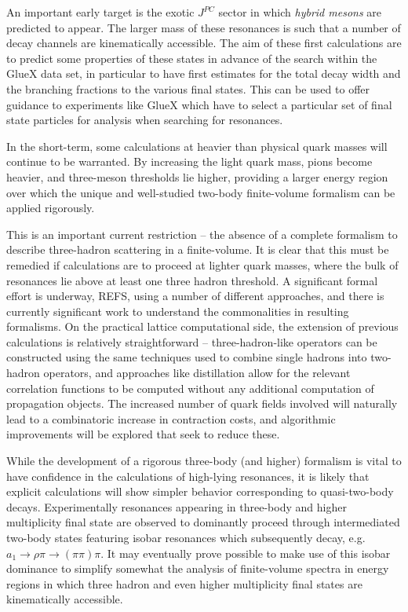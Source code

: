 {An important early target is the exotic $J^{PC}$ sector in which \emph{hybrid mesons} are predicted to appear. The larger mass of these resonances is such that a number of decay channels are kinematically accessible. The aim of these first calculations are to predict some properties of these states in advance of the search within the GlueX data set, in particular to have first estimates for the total decay width and the branching fractions to the various final states. This can be used to offer guidance to experiments like GlueX which have to select a particular set of final state particles for analysis when searching for resonances.

In the short-term, some calculations at heavier than physical quark masses will continue to be warranted. By increasing the light quark mass, pions become heavier, and three-meson thresholds lie higher, providing a larger energy region over which the unique and well-studied two-body finite-volume formalism can be applied rigorously. 

This is an important current restriction -- the absence of a complete formalism to describe three-hadron scattering in a finite-volume. It is clear that this must be remedied if calculations are to proceed at lighter quark masses, where the bulk of resonances lie above at least one three hadron threshold. A significant formal effort is underway, {\color{red}REFS}, using a number of different approaches, and there is currently significant work to understand the commonalities in resulting formalisms. On the practical lattice computational side, the extension of previous calculations is relatively straightforward -- three-hadron-like operators can be constructed using the same techniques used to combine single hadrons into two-hadron operators, and approaches like distillation allow for the relevant correlation functions to be computed without any additional computation of propagation objects. The increased number of quark fields involved will naturally lead to a combinatoric increase in contraction costs, and algorithmic improvements will be explored that seek to reduce these.

While the development of a rigorous three-body (and higher) formalism is vital to have confidence in the calculations of high-lying resonances, it is likely that explicit calculations will show simpler behavior corresponding to quasi-two-body decays. Experimentally resonances appearing in three-body and higher multiplicity final state are observed to dominantly proceed through intermediated two-body states featuring isobar resonances which subsequently decay, e.g. $a_1 \to \rho \pi \to (\pi\pi) \pi$. It may eventually prove possible to make use of this isobar dominance to simplify somewhat the analysis of finite-volume spectra in energy regions in which three hadron and even higher multiplicity final states are kinematically accessible.

}

